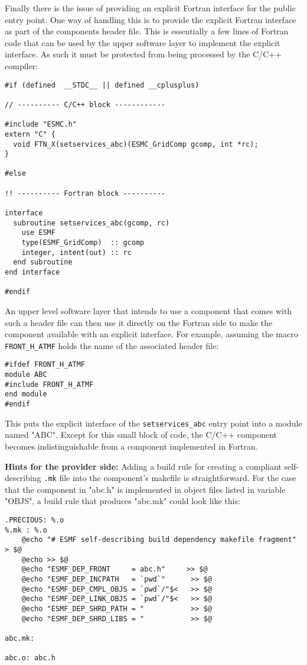 Finally there is the issue of providing an explicit Fortran interface for the public entry point. One way of handling this is to provide the explicit Fortran interface as part of the components header file. This is essentially a few lines of Fortran code that can be used by the upper software layer to implement the explicit interface. As such it must be protected from being processed by the C/C++ compiler:

\begin{verbatim}
#if (defined  __STDC__ || defined __cplusplus)

// ---------- C/C++ block ------------

#include "ESMC.h"
extern "C" {
  void FTN_X(setservices_abc)(ESMC_GridComp gcomp, int *rc);
}

#else

!! ---------- Fortran block ----------

interface
  subroutine setservices_abc(gcomp, rc)
    use ESMF
    type(ESMF_GridComp)  :: gcomp
    integer, intent(out) :: rc
  end subroutine
end interface

#endif
\end{verbatim}

An upper level software layer that intends to use a component that comes with such a header file can then use it directly on the Fortran side to make the component available with an explicit interface. For example, assuming the macro {\tt FRONT\_H\_ATMF} holds the name of the associated header file:

\begin{verbatim}
#ifdef FRONT_H_ATMF
module ABC
#include FRONT_H_ATMF
end module
#endif
\end{verbatim}

This puts the explicit interface of the {\tt setservices\_abc} entry point into a module named "ABC". Except for this small block of code, the C/C++ component becomes indistinguishable from a component implemented in Fortran.

{\bf Hints for the provider side:} Adding a build rule for creating a compliant self-describing {\tt .mk} file into the component's makefile is straightforward. For the case that the component in "abc.h" is implemented in object files listed in variable "OBJS", a build rule that produces "abc.mk" could look like this:

\begin{verbatim}
.PRECIOUS: %.o
%.mk : %.o
	@echo "# ESMF self-describing build dependency makefile fragment" > $@
	@echo >> $@
	@echo "ESMF_DEP_FRONT     = abc.h"     >> $@
	@echo "ESMF_DEP_INCPATH   = `pwd`"      >> $@
	@echo "ESMF_DEP_CMPL_OBJS = `pwd`/"$<   >> $@
	@echo "ESMF_DEP_LINK_OBJS = `pwd`/"$<   >> $@
	@echo "ESMF_DEP_SHRD_PATH = "           >> $@
	@echo "ESMF_DEP_SHRD_LIBS = "           >> $@

abc.mk:

abc.o: abc.h

\end{verbatim}

